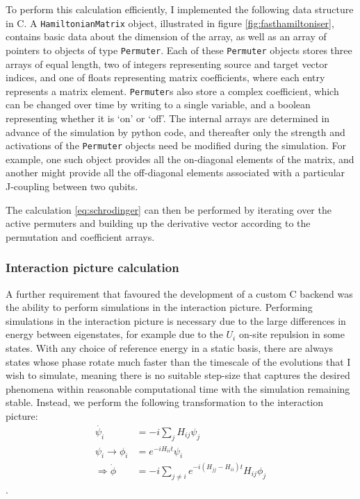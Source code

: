 \documentclass{report}
\begin{document}
\begin{appendices}
To perform this calculation efficiently, I implemented the following data structure in C. A \texttt{HamiltonianMatrix} object, illustrated in figure \ref{fig:fasthamiltoniser}, contains basic data about the dimension of the array, as well as an array of pointers to objects of type \texttt{Permuter}. Each of these \texttt{Permuter} objects stores three arrays of equal length, two of integers representing source and target vector indices, and one of floats representing matrix coefficients, where each entry represents a matrix element. \texttt{Permuter}s also store a complex coefficient, which can be changed over time by writing to a single variable, and a boolean representing whether it is `on' or `off'. The internal arrays are determined in advance of the simulation by python code, and thereafter only the strength and activations of the \texttt{Permuter} objects need be modified during the simulation. For example, one such object provides all the on-diagonal elements of the matrix, and another might provide all the off-diagonal elements associated with a particular J-coupling between two qubits.

The calculation \ref{eq:schrodinger} can then be performed by iterating over the active permuters and building up the derivative vector according to the permutation and coefficient arrays. 
\subsubsection{Interaction picture calculation}
A further requirement that favoured the development of a custom C backend was the ability to perform simulations in the interaction picture. Performing simulations in the interaction picture is necessary due to the large differences in energy between eigenstates, for example due to the $U_i$ on-site repulsion in some states. With any choice of reference energy in a static basis, there are always states whose phase rotate much faster than the timescale of the evolutions that I wish to simulate, meaning there is no suitable step-size that captures the desired phenomena within reasonable computational time with the simulation remaining stable. Instead, we perform the following transformation to the interaction picture:
\begin{align*}
    \dot{\psi_i} &= -i\sum_j{H_{ij}\psi_j}\\
     \psi_i \rightarrow \phi_i &= e^{-i H_{ii} t} \psi_i \\
    \Rightarrow \dot{\phi} &= -i\sum_{j\ne i}{e^{- i (H_{jj} - H_{ii})t} H_{ij}\phi_j}
\end{align*}.


\end{appendices}
\end{document}
